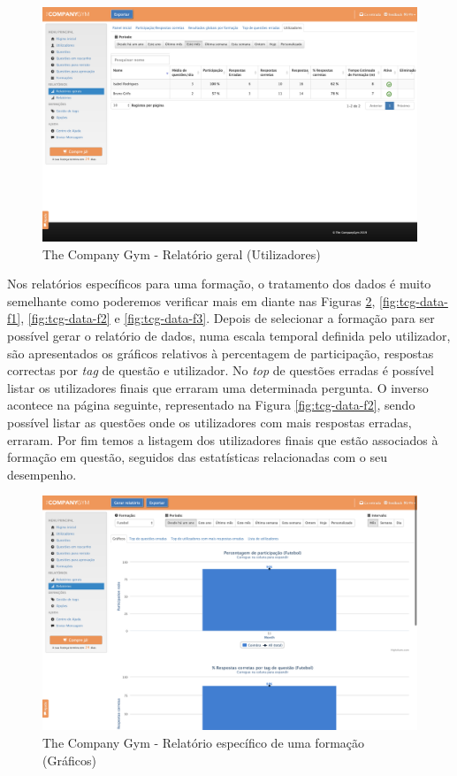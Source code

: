 \begin{figure}[ht!]
	\begin{center}
		\includegraphics[width=1\textwidth]{img/tcg/tcg-data4.png}
		\caption{The Company Gym - Relatório geral (Utilizadores)}
		\label{fig:tcg-data4}
	\end{center}
\end{figure}

Nos relatórios específicos para uma formação, o tratamento dos dados é muito semelhante como poderemos verificar mais em diante nas Figuras \ref{fig:tcg-data-f},  \ref{fig:tcg-data-f1}, \ref{fig:tcg-data-f2} e \ref{fig:tcg-data-f3}. Depois de selecionar a formação para ser possível gerar o relatório de dados, numa escala temporal definida pelo utilizador, são apresentados os gráficos relativos à percentagem de participação, respostas correctas por \textit{tag} de questão e utilizador. 
No \textit{top} de questões erradas é possível listar os utilizadores finais que erraram uma determinada pergunta. O inverso acontece na página seguinte, representado na Figura \ref{fig:tcg-data-f2}, sendo possível listar as questões onde os utilizadores com mais respostas erradas, erraram. 
Por fim temos a listagem dos utilizadores finais que estão associados à formação em questão, seguidos das estatísticas relacionadas com o seu desempenho.

\begin{figure}[ht!]
	\begin{center}
		\includegraphics[width=1\textwidth]{img/tcg/tcg-data-f.png}
		\caption{The Company Gym - Relatório específico de uma formação (Gráficos)}
		\label{fig:tcg-data-f}
	\end{center}
\end{figure}

